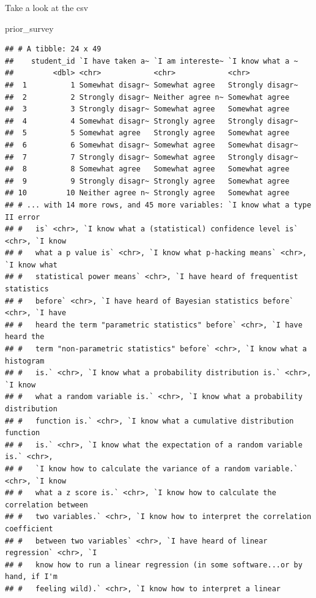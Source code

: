 \documentclass[
]{book}
\newenvironment{Shaded}{\begin{snugshade}}{\end{snugshade}}
\newcommand{\NormalTok}[1]{#1}
\begin{document}
Take a look at the csv

\begin{Shaded}
\begin{Highlighting}[]
\NormalTok{prior\_survey}
\end{Highlighting}
\end{Shaded}

\begin{verbatim}
## # A tibble: 24 x 49
##    student_id `I have taken a~ `I am intereste~ `I know what a ~
##         <dbl> <chr>            <chr>            <chr>           
##  1          1 Somewhat disagr~ Somewhat agree   Strongly disagr~
##  2          2 Strongly disagr~ Neither agree n~ Somewhat agree  
##  3          3 Strongly disagr~ Somewhat agree   Somewhat agree  
##  4          4 Somewhat disagr~ Strongly agree   Strongly disagr~
##  5          5 Somewhat agree   Strongly agree   Somewhat agree  
##  6          6 Somewhat disagr~ Somewhat agree   Somewhat disagr~
##  7          7 Strongly disagr~ Somewhat agree   Strongly disagr~
##  8          8 Somewhat agree   Somewhat agree   Somewhat agree  
##  9          9 Strongly disagr~ Strongly agree   Somewhat agree  
## 10         10 Neither agree n~ Strongly agree   Somewhat agree  
## # ... with 14 more rows, and 45 more variables: `I know what a type II error
## #   is` <chr>, `I know what a (statistical) confidence level is` <chr>, `I know
## #   what a p value is` <chr>, `I know what p-hacking means` <chr>, `I know what
## #   statistical power means` <chr>, `I have heard of frequentist statistics
## #   before` <chr>, `I have heard of Bayesian statistics before` <chr>, `I have
## #   heard the term "parametric statistics" before` <chr>, `I have heard the
## #   term "non-parametric statistics" before` <chr>, `I know what a histogram
## #   is.` <chr>, `I know what a probability distribution is.` <chr>, `I know
## #   what a random variable is.` <chr>, `I know what a probability distribution
## #   function is.` <chr>, `I know what a cumulative distribution function
## #   is.` <chr>, `I know what the expectation of a random variable is.` <chr>,
## #   `I know how to calculate the variance of a random variable.` <chr>, `I know
## #   what a z score is.` <chr>, `I know how to calculate the correlation between
## #   two variables.` <chr>, `I know how to interpret the correlation coefficient
## #   between two variables` <chr>, `I have heard of linear regression` <chr>, `I
## #   know how to run a linear regression (in some software...or by hand, if I'm
## #   feeling wild).` <chr>, `I know how to interpret a linear

\end{verbatim}
\end{document}
